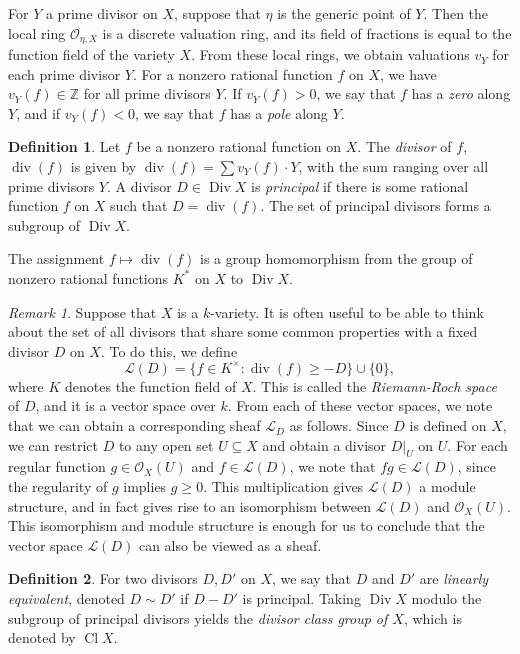 \documentclass[12pt,twoside]{reedthesis}
\theoremstyle{plain}
\theoremstyle{definition}
\newtheorem{definition}{Definition}[section]
\theoremstyle{remark}
\newtheorem{remark}{Remark}[section]
\newcommand{\ZZ}{\mathbb{Z}}
\newcommand{\calO}{\mathcal{O}}
\newcommand{\Div}{\operatorname{Div}}
\newcommand{\Cl}{\operatorname{Cl}}
\renewcommand{\div}{\operatorname{div}}
\begin{document}
For $Y$ a prime divisor on $X$, suppose that $\eta$ is the generic point of $Y$. Then the local ring $\calO_{\eta, X}$ is a discrete valuation ring, and its field of fractions is equal to the function field of the variety $X$. From these local rings, we obtain valuations $v_Y$ for each prime divisor $Y$. For a nonzero  rational function $f$ on $X$, we have $v_Y(f)\in\ZZ$ for all prime divisors $Y$. If $v_Y(f)>0$, we say that $f$ has a \emph{zero} along $Y$, and if $v_Y(f)<0$, we say that $f$ has a \emph{pole} along $Y$.

\begin{definition}
Let $f$ be a nonzero rational function on $X$. The \emph{divisor} of $f$, $\div(f)$ is given by $\div(f)=\sum v_Y(f)\cdot Y$, with the sum ranging over all prime divisors $Y$. A divisor $D\in\Div X$ is \emph{principal} if there is some rational function $f$ on $X$ such that $D=\div(f)$. The set of principal divisors forms a subgroup of $\Div X$.
\end{definition}

\noindent The assignment $f\mapsto\div(f)$ is a group homomorphism from the group of nonzero rational functions $K^*$ on $X$ to $\Div X$. 

\begin{remark}\label{divSpace}
Suppose that $X$ is a $k$-variety. It is often useful to be able to think about the set of all divisors that share some common properties with a fixed divisor $D$ on $X$. To do this, we define \[\mathcal{L}(D)=\{f\in K^\times: \div(f)\geq -D\}\cup\{0\},\] where $K$ denotes the function field of $X$. This is called the \emph{Riemann-Roch space} of $D$, and it is a vector space over $k$. From each of these vector spaces, we note that we can obtain a corresponding sheaf $\mathcal{L}_D$ as follows. Since $D$ is defined on $X$, we can restrict $D$ to any open set $U\subseteq X$ and obtain a divisor $D|_U$ on $U$. For each regular function $g\in\calO_X(U)$ and $f\in\mathcal{L}(D)$, we note that $fg\in\mathcal{L}(D)$, since the regularity of $g$ implies $g\geq0$. This multiplication gives $\mathcal{L}(D)$ a module structure, and in fact gives rise to an isomorphism between $\mathcal{L}(D)$ and $\calO_X(U)$. This isomorphism and module structure is enough for us to conclude that the vector space $\mathcal{L}(D)$ can also be viewed as a sheaf.
\end{remark}

\begin{definition}
For two divisors $D,D'$ on $X$, we say that $D$ and $D'$ are \emph{linearly equivalent}, denoted $D\sim D'$ if $D-D'$ is principal. Taking $\Div X$ modulo the subgroup of principal divisors yields the \emph{divisor class group of $X$}, which is denoted by $\Cl X$.
\end{definition}
\end{document}
